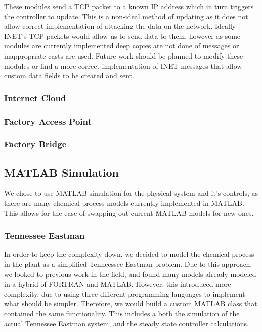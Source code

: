 These modules send a TCP packet to a known IP address which in turn triggers the controller to update. This is a non-ideal method of updating as it does not allow correct implementation of attacking the data on the network. Ideally INET's TCP packets would allow us to send data to them, however as some modules are currently implemented deep copies are not done of messages or inappropriate casts are used. Future work should be planned to modify these modules or find a more correct
implementation of INET messages that allow custom data fields to be created and sent. 

\subsubsection{Internet Cloud}

\subsubsection{Factory Access Point}

\subsubsection{Factory Bridge}

\subsection{MATLAB Simulation}
  We chose to use MATLAB simulation for the physical system and it's controls, 
  as there are many chemical process models currently implemented in MATLAB.
  This allows for the ease of swapping out current MATLAB models for new ones.

\subsubsection{Tennessee Eastman}
  In order to keep the complexity down, we decided to model the chemical process
  in the plant as a simplified Tenneessee Eastman problem. 
  Due to this approach, we looked to previous work in the field, and found many
  models already modeled in a hybrid of FORTRAN and MATLAB.  However, this 
  introduced more complexity, due to using three different programming languages
  to implement what should be simpler.  Therefore, we would build a custom
  MATLAB class that contained the same functionality.  This includes a both the
  simulation of the actual Tennessee Eastman system, and the steady state 
  controller calculations.

